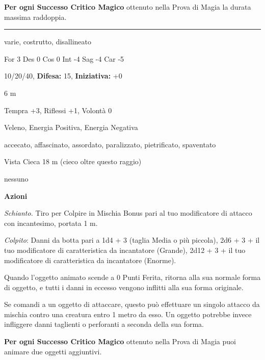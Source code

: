 \begin{multicols}{2}
\textbf{Per ogni Successo Critico Magico} ottenuto nella Prova di Magia la durata massima raddoppia.

\medskip

\noindent\rule{\linewidth}{2pt}  \hypertarget{Oggetto Animato}{}\medskip {}
\noindent
\begin{description}[noitemsep, topsep=0pt, parsep=0pt, partopsep=0pt, leftmargin=0cm, labelwidth=2.2cm]
	\item[\textbf{Tipo:}] varie, costrutto, disallineato
	\item[\textbf{Caratt.:}] For 3 Des 0 Cos 0 Int -4 Sag -4 Car -5
	\item[\textbf{Punti Ferita:}] 10/20/40,  \textbf{Difesa:} 15,  \textbf{Iniziativa:} +0
	\item[\textbf{Movimento:}] 6 m
	\item[\textbf{Tiri Salvezza:}] Tempra +3, Riflessi +1, Volontà 0
	\item[\textbf{Imm. Danni:}] Veleno, Energia Positiva, Energia Negativa
	\item[\textbf{Immunità:}] accecato, affascinato, assordato, paralizzato, pietrificato, spaventato
	\item[\textbf{Sensi:}] Vista Cieca 18 m (cieco oltre questo raggio)
	\item[\textbf{Sfida:}] nessuno\smallskip
\end{description}

\textbf{Azioni}

\textit{Schianto.} Tiro per Colpire in Mischia Bonus pari al tuo modificatore di attacco con incantesimo, portata 1 m.

\emph{Colpito}: Danni da botta pari a 1d4 + 3 (taglia Media o più piccola), 2d6 + 3 + il tuo modificatore di caratteristica da incantatore (Grande),  2d12 + 3 + il tuo modificatore di caratteristica da incantatore (Enorme).

Quando l'oggetto animato scende a 0 Punti Ferita, ritorna alla sua normale forma di oggetto, e tutti i danni in eccesso vengono inflitti alla sua forma originale.

Se comandi a un oggetto di attaccare, questo può effettuare un singolo attacco da mischia contro una creatura entro 1 metro da esso. Un oggetto potrebbe invece infliggere danni taglienti o perforanti a seconda della sua forma.

\textbf{Per ogni Successo Critico Magico} ottenuto nella Prova di Magia puoi animare due oggetti aggiuntivi.


\end{multicols}
